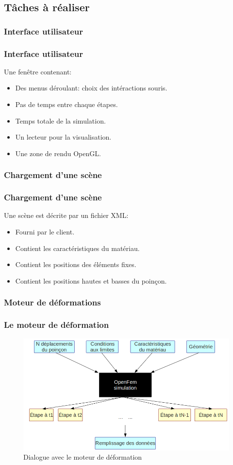 \documentclass{beamer}
\begin{document}
\subsection{Tâches à réaliser}
\subsubsection{Interface utilisateur}
\begin{frame}
    \frametitle{Interface utilisateur}
    Une fenêtre contenant:
    \begin{itemize}
        \item Des menus déroulant: choix des intéractions souris.
        \item Pas de temps entre chaque étapes.
        \item Temps totale de la simulation.
        \item Un lecteur pour la visualisation.
        \item Une zone de rendu OpenGL.
    \end{itemize}
\end{frame}
\subsubsection{Chargement d'une scène}
\begin{frame}
    \frametitle{Chargement d'une scène}
    Une scène est décrite par un fichier XML:
    \begin{itemize}
        \item Fourni par le client.
        \item Contient les caractéristiques du matériau.
        \item Contient les positions des éléments fixes.
        \item Contient les positions hautes et basses du poinçon.
    \end{itemize}
\end{frame}
\subsubsection{Moteur de déformations}
\begin{frame}
    \frametitle{Le moteur de déformation}
    \begin{figure}
        \includegraphics[width=\textwidth]{img/OpenFEM.png}
        \caption{Dialogue avec le moteur de déformation}
    \end{figure}
\end{frame}
\end{document}

